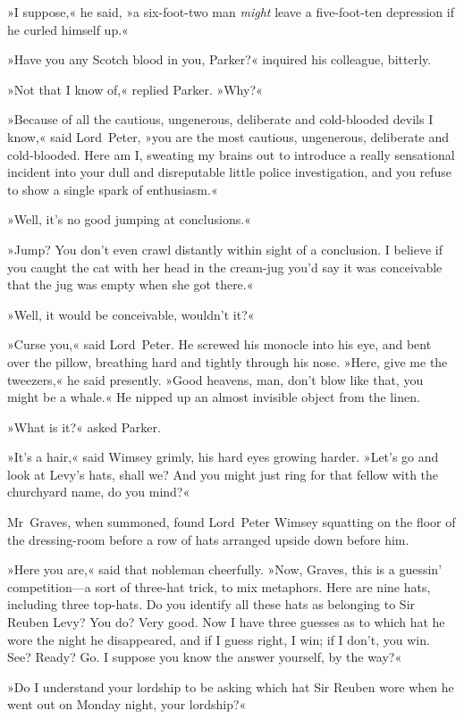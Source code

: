 »I suppose,« he said, »a six-foot-two man \textit{might} leave a five-foot-ten depression if he curled himself up.«

»Have you any Scotch blood in you, Parker?« inquired his colleague, bitterly.

»Not that I know of,« replied Parker. »Why?«

»Because of all the cautious, ungenerous, deliberate and cold-blooded devils I know,« said Lord~Peter, »you are the most cautious, ungenerous, deliberate and cold-blooded. Here am I, sweating my brains out to introduce a really sensational incident into your dull and disreputable little police investigation, and you refuse to show a single spark of enthusiasm.«

»Well, it's no good jumping at conclusions.«

»Jump? You don't even crawl distantly within sight of a conclusion. I believe if you caught the cat with her head in the cream-jug you'd say it was conceivable that the jug was empty when she got there.«

»Well, it would be conceivable, wouldn't it?«

»Curse you,« said Lord~Peter. He screwed his monocle into his eye, and bent over the pillow, breathing hard and tightly through his nose. »Here, give me the tweezers,« he said presently. »Good heavens, man, don't blow like that, you might be a whale.« He nipped up an almost invisible object from the linen.

»What is it?« asked Parker.

»It's a hair,« said Wimsey grimly, his hard eyes growing harder. »Let's go and look at Levy's hats, shall we? And you might just ring for that fellow with the churchyard name, do you mind?«

Mr~Graves, when summoned, found Lord~Peter Wimsey squatting on the floor of the dressing-room before a row of hats arranged upside down before him.

»Here you are,« said that nobleman cheerfully. »Now, Graves, this is a guessin' competition—a sort of three-hat trick, to mix metaphors. Here are nine hats, including three top-hats. Do you identify all these hats as belonging to Sir Reuben Levy? You do? Very good. Now I have three guesses as to which hat he wore the night he disappeared, and if I guess right, I win; if I don't, you win. See? Ready? Go. I suppose you know the answer yourself, by the way?«

»Do I understand your lordship to be asking which hat Sir Reuben wore when he went out on Monday night, your lordship?«

